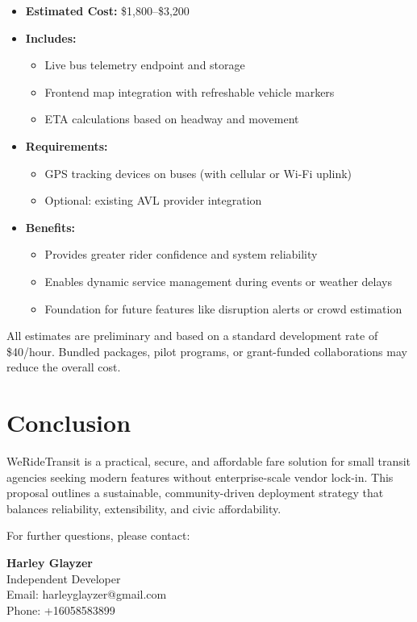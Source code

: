 \documentclass[12pt]{article}
\begin{document}
\begin{itemize}
    \item \textbf{Estimated Cost:} \$1,800–\$3,200
    \item \textbf{Includes:}
    \begin{itemize}
        \item Live bus telemetry endpoint and storage
        \item Frontend map integration with refreshable vehicle markers
        \item ETA calculations based on headway and movement
    \end{itemize}
    \item \textbf{Requirements:}
    \begin{itemize}
        \item GPS tracking devices on buses (with cellular or Wi-Fi uplink)
        \item Optional: existing AVL provider integration
    \end{itemize}
    \item \textbf{Benefits:}
    \begin{itemize}
        \item Provides greater rider confidence and system reliability
        \item Enables dynamic service management during events or weather delays
        \item Foundation for future features like disruption alerts or crowd estimation
    \end{itemize}
\end{itemize}

\vspace{1em}
\noindent All estimates are preliminary and based on a standard development rate of \$40/hour. Bundled packages, pilot programs, or grant-funded collaborations may reduce the overall cost.


\section{Conclusion}
WeRideTransit is a practical, secure, and affordable fare solution for small transit agencies seeking modern features without enterprise-scale vendor lock-in. This proposal outlines a sustainable, community-driven deployment strategy that balances reliability, extensibility, and civic affordability.

\vspace{1em}
\noindent For further questions, please contact:

\vspace{0.5em}
\noindent \textbf{Harley Glayzer} \\
Independent Developer \\
Email: harleyglayzer@gmail.com \\
Phone: +16058583899 \\
\end{document}
